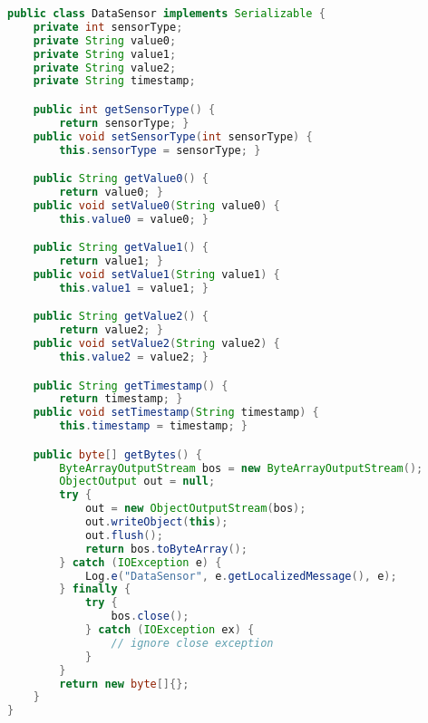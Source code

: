 \begin{lstlisting}[language=Java,  basicstyle=\footnotesize]
public class DataSensor implements Serializable {
    private int sensorType;
    private String value0;
    private String value1;
    private String value2;
    private String timestamp;

    public int getSensorType() {
        return sensorType; }
    public void setSensorType(int sensorType) {
        this.sensorType = sensorType; }

    public String getValue0() {
        return value0; }
    public void setValue0(String value0) {
        this.value0 = value0; }

    public String getValue1() {
        return value1; }
    public void setValue1(String value1) {
        this.value1 = value1; }

    public String getValue2() {
        return value2; }
    public void setValue2(String value2) {
        this.value2 = value2; }

    public String getTimestamp() {
        return timestamp; }
    public void setTimestamp(String timestamp) {
        this.timestamp = timestamp; }

    public byte[] getBytes() {
        ByteArrayOutputStream bos = new ByteArrayOutputStream();
        ObjectOutput out = null;
        try {
            out = new ObjectOutputStream(bos);
            out.writeObject(this);
            out.flush();
            return bos.toByteArray();
        } catch (IOException e) {
            Log.e("DataSensor", e.getLocalizedMessage(), e);
        } finally {
            try {
                bos.close();
            } catch (IOException ex) {
                // ignore close exception
            }
        }
        return new byte[]{};
    }
}
\end{lstlisting}